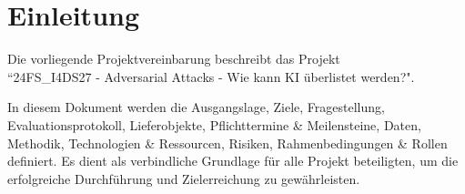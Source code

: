 \section{Einleitung}
Die vorliegende Projektvereinbarung beschreibt das Projekt \\ 
``24FS\_I4DS27 - Adversarial Attacks - Wie kann KI überlistet werden?". 

In diesem Dokument werden die Ausgangslage, Ziele, Fragestellung, Evaluationsprotokoll, Lieferobjekte, Pflichttermine \& Meilensteine, Daten, Methodik, Technologien \& Ressourcen, Risiken, Rahmenbedingungen \& Rollen definiert. Es dient als verbindliche Grundlage für alle Projekt beteiligten, um die erfolgreiche Durchführung und Zielerreichung zu gewährleisten.
